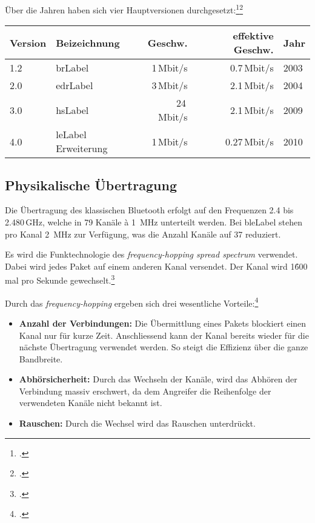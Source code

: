 Über die Jahren haben sich vier Hauptversionen durchgesetzt:\footcite{Bluetooth_low_energy_Wikipedia_2015-04-17}\footcite{Our_History_Bluetooth_Technology_Website_2015-04-17}
\begin{table}[H]
\small\sffamily\renewcommand{\arraystretch}{1.4}
\begin{tabular}{llrrl}
\toprule
	Version & Beizeichnung & Geschw. & effektive Geschw.  & Jahr\\
\midrule
	1.2 & \gls{brLabel} & 1\,Mbit/s & 0.7\,Mbit/s & 2003 \\
	2.0 & \gls{edrLabel} & 3\,Mbit/s & 2.1\,Mbit/s & 2004 \\
	3.0 & \gls{hsLabel} & 24\,Mbit/s & 2.1\,Mbit/s & 2009\\
	4.0 & \gls{leLabel} Erweiterung & 1\,Mbit/s &  0.27\,Mbit/s & 2010 \\
\bottomrule
\end{tabular}
\end{table}



\subsection{Physikalische Übertragung}
Die Übertragung des klassischen Bluetooth erfolgt auf den Frequenzen 2.4 bis 2.480\,GHz, welche in 79 Kanäle à 1\, MHz unterteilt werden.
Bei \gls{bleLabel} stehen pro Kanal 2\, MHz zur Verfügung, was die Anzahl Kanäle auf 37 reduziert.

Es wird die Funktechnologie des \textit{frequency-hopping spread spectrum} verwendet.
Dabei wird jedes Paket auf einem anderen Kanal versendet.
Der Kanal wird 1\'600 mal pro Sekunde gewechselt.\footcite{Bluetooth_Wikipedia_2015-04-17}

Durch das \textit{frequency-hopping} ergeben sich drei wesentliche Vorteile:\footcite{Frequency-hopping_spread_spectrum_-_Wikipedia_2015-04-17}
\begin{itemize}
	\item \textbf{Anzahl der Verbindungen:} Die Übermittlung eines Pakets blockiert einen Kanal nur für kurze Zeit.
		Anschliessend kann der Kanal bereits wieder für die nächste Übertragung verwendet werden.
		So steigt die Effizienz über die ganze Bandbreite.
	\item \textbf{Abhörsicherheit:} Durch das Wechseln der Kanäle, wird das Abhören der Verbindung massiv erschwert, da dem Angreifer die Reihenfolge der verwendeten Kanäle nicht bekannt ist.
	\item \textbf{Rauschen:} Durch die Wechsel wird das Rauschen unterdrückt.
\end{itemize}

